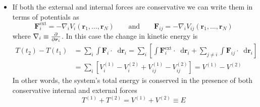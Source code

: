 \documentclass[11pt, a4paper]{article}
\newcommand{\eqtext}[1]{\qquad \text{#1} \qquad}
\newcommand{\diff}{\mathop{}\!\mathrm{d}} %
\renewcommand{\grad}{\nabla }
\begin{document}
\begin{itemize}
	\item If both the external and internal forces are conservative we can write them in terms of potentials as
	\begin{equation*}
		\bm{F}^{\text{ext}}_{i} = - \grad_{i}V_{i}(\bm{r}_{1}, \ldots, \bm{r}_{N}) \eqtext{and} \bm{F}_{ij} = - \grad_{i}V_{ij}(\bm{r}_{1}, \ldots, \bm{r}_{N})
	\end{equation*}
	where $ \grad_{i} \equiv \pdv{}{\bm{r}_{i}} $. In this case the change in kinetic energy is
	\begin{align*}
		T(t_{2}) - T(t_{1}) &= \sum_{i} \int \bm{F}_{i} \cdot \diff \bm{r}_{i} =	\sum_{i} \left[\int \bm{F}^{\text{ext}}_{i} \cdot \diff \bm{r}_{i} + \sum_{j \neq i} \int \bm{F}_{ij} \cdot \diff \bm{r}_{i} \right]\\
		&=\sum_{i} \left[V_{i}^{(1)} - V_{i}^{(2)} + V_{ij}^{(1)} - V_{ij}^{(2)} \right] = V^{(1)} - V^{(2)}
	\end{align*}
	In other words, the system's total energy is conserved in the presence of both conservative internal and external forces
	\begin{equation*}
		T^{(1)} + T^{(2)} = V^{(1)} + V^{(2)} \equiv E
	\end{equation*}
	
\end{itemize}
\end{document}
